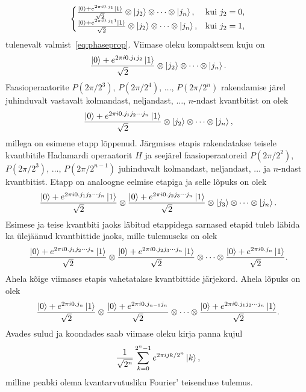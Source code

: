 \documentclass[12pt]{report}
\def\ket#1{\left|#1\right>}
\begin{document}
\begin{align}
    \begin{cases}
        \frac{\ket{0} + e^{2\pi i0.j_1}\ket{1}}{\sqrt{2}} \otimes \ket{j_2} \otimes \cdots \otimes \ket{j_n}\text{,} & \text{kui \(j_2 = 0\)} \rlap{,} \\
        \frac{\ket{0} + e^{2\pi i0.j_11}\ket{1}}{\sqrt{2}} \otimes \ket{j_2} \otimes \cdots \otimes \ket{j_n}\text{,} & \text{kui \(j_2 = 1\)} \rlap{,} \\
    \end{cases}
\end{align}
tulenevalt valmist~\eqref{eq:phaseprop}.
Viimase oleku kompaktsem kuju on
\begin{align}
    \frac{\ket{0} + e^{2\pi i0.j_1j_2}\ket{1}}{\sqrt{2}} \otimes \ket{j_2} \otimes \cdots \otimes \ket{j_n} \rlap{.}
\end{align}
Faasioperaatorite \(P(2\pi/2^3)\), \(P(2\pi/2^4)\), \(\ldots\), \(P(2\pi/2^n)\) rakendamise järel juhinduvalt vastavalt kolmandast, neljandast, \(\ldots\), \(n\)-ndast kvantbitist on olek
\begin{align}
   \frac{\ket{0} + e^{2\pi i0.j_1j_2\cdots j_n}\ket{1}}{\sqrt{2}} \otimes \ket{j_2} \otimes \cdots \otimes \ket{j_n} \rlap{,}
\end{align}
millega on esimene etapp lõppenud.
Järgmises etapis rakendatakse teisele kvantbitile Hadamardi operaatorit \(H\) ja seejärel faasioperaatoreid \(P(2\pi/2^2)\), \(P(2\pi/2^3)\), \(\ldots\), \(P(2\pi/2^{n-1})\) juhinduvalt kolmandast, neljandast, \(\ldots\) ja \(n\)-ndast kvantbitist.
Etapp on analoogne eelmise etapiga ja selle lõpuks on olek
\begin{align}
    \frac{\ket{0} + e^{2\pi i0.j_1j_2\cdots j_n}\ket{1}}{\sqrt{2}}
    \otimes \frac{\ket{0} + e^{2\pi i0.j_2j_3\cdots j_n}\ket{1}}{\sqrt{2}}
    \otimes \ket{j_3} \otimes \cdots \otimes \ket{j_n} \rlap{.}
\end{align}
Esimese ja teise kvantbiti jaoks läbitud etappidega sarnased etapid tuleb läbida ka ülejäänud kvantbittide jaoks, mille tulemuseks on olek
\begin{align}
    \frac{\ket{0} + e^{2\pi i0.j_1j_2\cdots j_n}\ket{1}}{\sqrt{2}}
    \otimes \frac{\ket{0} + e^{2\pi i0.j_2j_3\cdots j_n}\ket{1}}{\sqrt{2}}
    \otimes \cdots
    \otimes \frac{\ket{0} + e^{2\pi i0.j_n}\ket{1}}{\sqrt{2}} \rlap{.}
\end{align}
Ahela kõige viimases etapis vahetatakse kvantbittide järjekord.
Ahela lõpuks on olek
\begin{align}\label{f:qftfinal}
    \frac{\ket{0} + e^{2\pi i0.j_n}\ket{1}}{\sqrt{2}}
    \otimes \frac{\ket{0} + e^{2\pi i0.j_{n-1}j_n}}{\sqrt{2}}
    \otimes \cdots
    \otimes \frac{\ket{0} + e^{2\pi i0.j_1j_2\cdots j_n}\ket{1}}{\sqrt{2}} \rlap{.}
\end{align}
Avades sulud ja koondades saab viimase oleku kirja panna kujul
\begin{equation}\label{f:qftfinaltrans}
    \frac{1}{\sqrt{2^n}}\sum_{k=0}^{2^n-1}e^{2\pi ijk/2^n}\ket k \rlap{,}
\end{equation}
milline peabki olema kvantarvutusliku Fourier' teisenduse tulemus.
\end{document}
